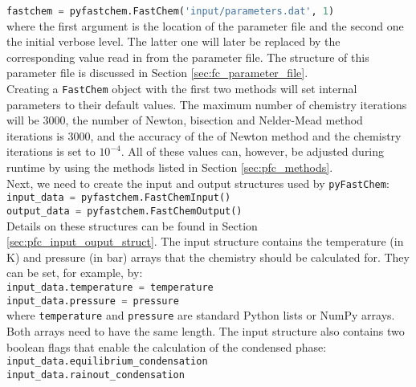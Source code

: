 \documentclass[numbers=noenddot]{aux/fcmanual}
\newcommand{\fc}{\texttt{FastChem}\xspace}
\newcommand{\pfc}{\texttt{pyFastChem}\xspace}
\begin{document}
\lstinline[language=Python]!fastchem = pyfastchem.FastChem('input/parameters.dat', 1)!\\

where the first argument is the location of the parameter file and the second one the initial verbose level. The latter one will later be replaced by the corresponding value read in from the parameter file. The structure of this parameter file is discussed in Section \ref{sec:fc_parameter_file}.\\

Creating a \fc object with the first two methods will set internal parameters to their default values. The maximum number of chemistry iterations will be 3000, the number of Newton, bisection and Nelder-Mead method iterations is 3000, and the accuracy of the of Newton method and the chemistry iterations is set to $10^{-4}$. All of these values can, however, be adjusted during runtime by using the methods listed in Section \ref{sec:pfc_methods}.\\

Next, we need to create the input and output structures used by \pfc:\\

\lstinline[language=Python]!input_data = pyfastchem.FastChemInput()!\\
\lstinline[language=Python]!output_data = pyfastchem.FastChemOutput()!\\

Details on these structures can be found in Section \ref{sec:pfc_input_ouput_struct}. The input structure contains the temperature (in K) and pressure (in bar) arrays that the chemistry should be calculated for. They can be set, for example, by:\\

\lstinline[language=Python]!input_data.temperature = temperature!\\
\lstinline[language=Python]!input_data.pressure = pressure!\\

where \lstinline[language=Python]!temperature! and \lstinline[language=Python]!pressure! are standard Python lists or NumPy arrays. Both arrays need to have the same length. The input structure also contains two boolean flags that enable the calculation of the condensed phase:\\

\lstinline[language=Python]!input_data.equilibrium_condensation!\\
\lstinline[language=Python]!input_data.rainout_condensation!\\
\end{document}
